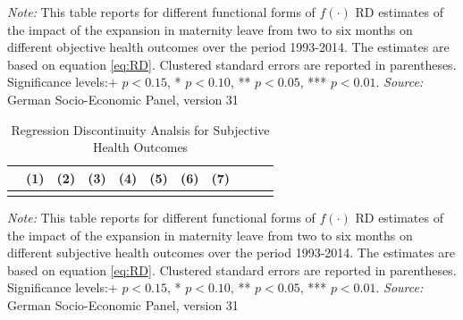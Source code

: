 \documentclass[a4paper ]{article}
\begin{document}
\begin{table}[p] \centering
\def\sym#1{\ifmmode^{#1}\else\(^{#1}\)\fi}
\caption{Regression Discontinuity Analysis for Objective Health Outcomes}\label{tab:RD_OH}
\begin{minipage}{0.95\textwidth} %
{\footnotesize \textit{Note:} This table reports for different functional forms of $f(\cdot)$ RD estimates of the impact of the expansion in maternity leave from two to six months on different objective health outcomes over the period 1993-2014. The estimates are based on equation \ref{eq:RD}.\newline
Clustered standard errors are reported in parentheses. Significance levels:+ \(p<0.15\), * \(p<0.10\), ** \(p<0.05\), *** \(p<0.01\). \newline \textit{Source: }German Socio-Economic Panel, version 31\par}
\end{minipage}
\end{table}

\clearpage
\begin{table}[p] \centering
\def\sym#1{\ifmmode^{#1}\else\(^{#1}\)\fi}
\caption{Regression Discontinuity Analsis for Subjective Health Outcomes}\label{tab:RD_SH}
{\renewcommand{\tabcolsep}{2pt}
\begin{tabular}{l*{10}{c}}
\toprule
 &\multicolumn{1}{c}{(1)}&\multicolumn{1}{c}{(2)}&\multicolumn{1}{c}{(3)}&\multicolumn{1}{c}{(4)}&\multicolumn{1}{c}{(5)} &\multicolumn{1}{c}{(6)}&\multicolumn{1}{c}{(7)}\\

\midrule\\
	 
 \bottomrule
\end{tabular}}

\begin{minipage}{0.95\textwidth} %
{\footnotesize \textit{Note:} This table reports for different functional forms of $f(\cdot)$ RD estimates of the impact of the expansion in maternity leave from two to six months on different subjective health outcomes over the period 1993-2014. The estimates are based on equation \ref{eq:RD}.\newline
Clustered standard errors are reported in parentheses. Significance levels:+ \(p<0.15\), * \(p<0.10\), ** \(p<0.05\), *** \(p<0.01\). \newline \textit{Source: }German Socio-Economic Panel, version 31\par}
\end{minipage}
\end{table}
\end{document}
